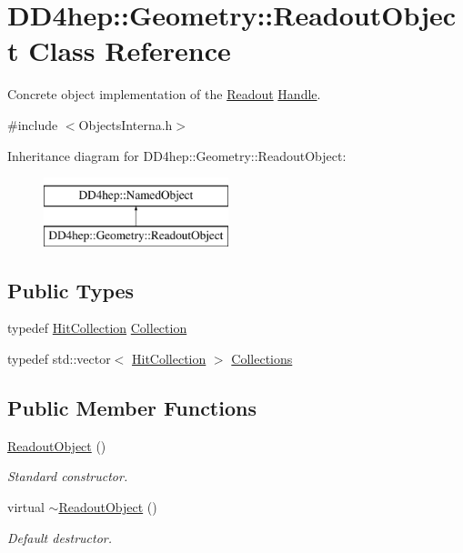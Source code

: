 \hypertarget{class_d_d4hep_1_1_geometry_1_1_readout_object}{}\section{D\+D4hep\+:\+:Geometry\+:\+:Readout\+Object Class Reference}
\label{class_d_d4hep_1_1_geometry_1_1_readout_object}


Concrete object implementation of the \hyperlink{class_d_d4hep_1_1_geometry_1_1_readout}{Readout} \hyperlink{class_d_d4hep_1_1_handle}{Handle}.  




{\ttfamily \#include $<$Objects\+Interna.\+h$>$}

Inheritance diagram for D\+D4hep\+:\+:Geometry\+:\+:Readout\+Object\+:\begin{figure}[H]
\begin{center}
\leavevmode
\includegraphics[height=2.000000cm]{class_d_d4hep_1_1_geometry_1_1_readout_object}
\end{center}
\end{figure}
\subsection*{Public Types}
\begin{DoxyCompactItemize}
\item 
typedef \hyperlink{class_d_d4hep_1_1_geometry_1_1_hit_collection}{Hit\+Collection} \hyperlink{class_d_d4hep_1_1_geometry_1_1_readout_object_a3789c1e548f014ce44e2af9ff12f9757}{Collection}
\item 
typedef std\+::vector$<$ \hyperlink{class_d_d4hep_1_1_geometry_1_1_hit_collection}{Hit\+Collection} $>$ \hyperlink{class_d_d4hep_1_1_geometry_1_1_readout_object_a1093be792a71654cf6116686b0ab7cb6}{Collections}
\end{DoxyCompactItemize}
\subsection*{Public Member Functions}
\begin{DoxyCompactItemize}
\item 
\hyperlink{class_d_d4hep_1_1_geometry_1_1_readout_object_a996d7d31d97422f508786b6ba827fb84}{Readout\+Object} ()
\begin{DoxyCompactList}\small\item\em Standard constructor. \end{DoxyCompactList}\item 
virtual \hyperlink{class_d_d4hep_1_1_geometry_1_1_readout_object_a5a3ba52dd04797f7b3125688d0496507}{$\sim$\+Readout\+Object} ()
\begin{DoxyCompactList}\small\item\em Default destructor. \end{DoxyCompactList}\end{DoxyCompactItemize}
